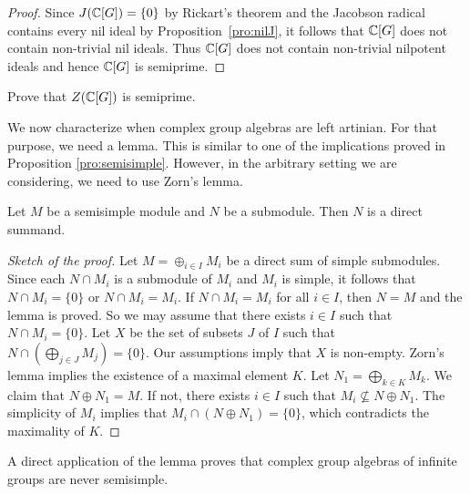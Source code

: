 \begin{proof}
	Since $J(\mathbb{C}[G])=\{0\}$ by Rickart's theorem and the Jacobson radical
	contains every nil ideal by Proposition~\ref{pro:nilJ}, it follows that
	$\mathbb{C}[G]$ does not contain non-trivial nil ideals. Thus $\mathbb{C}[G]$ does not
	contain non-trivial nilpotent ideals and hence $\mathbb{C}[G]$ is semiprime.
\end{proof}

\begin{exercise}
	Prove that $Z(\mathbb{C}[G])$ is semiprime.
\end{exercise}

We now characterize when complex group algebras 
are left artinian. For that purpose,
we need a lemma. This is similar to one of the implications proved in Proposition \ref{pro:semisimple}. However,
in the arbitrary setting we are considering, we need to use Zorn's lemma. 

\begin{lemma}
\label{lem:direct_summand}
    Let $M$ be a semisimple module and $N$ be a submodule. 
    Then $N$ is a direct summand.
\end{lemma}

\begin{proof}[Sketch of the proof]
    Let $M=\oplus_{i\in I}M_i$ be a direct sum of simple submodules. 
    Since each $N\cap M_i$ is a submodule of $M_i$ and $M_i$ is simple, it follows
    that $N\cap M_i=\{0\}$ or $N\cap M_i=M_i$. If
    $N\cap M_i=M_i$ for all $i\in I$, then $N=M$ and the lemma is proved. So we may assume
    that there exists $i\in I$ such that $N\cap M_i=\{0\}$. Let $X$ be the set
    of subsets $J$ of $I$ such that $N\cap (\bigoplus_{j\in J}M_j)=\{0\}$. Our assumptions
    imply that $X$ is non-empty. Zorn's lemma implies the existence of 
    a maximal element $K$. Let $N_1=\bigoplus_{k\in K}M_k$. We claim that
    $N\oplus N_1=M$. If not, there exists $i\in I$ such that
    $M_i\not\subseteq N\oplus N_1$. The simplicity of $M_i$ implies that
    $M_i\cap (N\oplus N_1)=\{0\}$, which contradicts the maximality of $K$. 
\end{proof}

A direct application of the lemma proves that
complex group algebras of infinite groups are never semisimple. 


